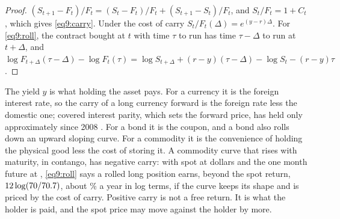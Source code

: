 \begin{chapterrefs}
\begin{proof}
$(S_{t+1}-F_t)/F_t=(S_t-F_t)/F_t+(S_{t+1}-S_t)/F_t$, and $S_t/F_t=1+C_t$, which gives \cref{eq9:carry}. Under the
cost of carry $S_t/F_t(\Delta)=e^{(y-r)\Delta}$. For \cref{eq9:roll}, the contract bought at $t$ with time
$\tau$ to run has time $\tau-\Delta$ to run at $t+\Delta$, and
$\log F_{t+\Delta}(\tau-\Delta)-\log F_t(\tau)=\log S_{t+\Delta}+(r-y)(\tau-\Delta)-\log S_t-(r-y)\tau$.
\end{proof}

The yield $y$ is what holding the asset pays. For a currency it is the foreign interest rate, so the
carry of a long currency forward is the foreign rate less the domestic one; covered interest parity,
which sets the forward price, has held only approximately since 2008 \parencite{du2018}. For a bond it
is the coupon, and a bond also rolls down an upward sloping curve. For a commodity it is the
convenience of holding the physical good less the cost of storing it. A commodity curve that rises
with maturity, in contango, has negative carry: with spot at \oilS{} dollars and the one month future at
\oilFOne, \cref{eq9:roll} says a rolled long position earns, beyond the spot return, $12\log(70/70.7)$, about
\oilRoll\% a year in log terms, if the curve keeps its shape and is priced by the cost of carry. Positive carry is not a free
return. It is what the holder is paid, and the spot price may move against the holder by more.


\end{chapterrefs}

